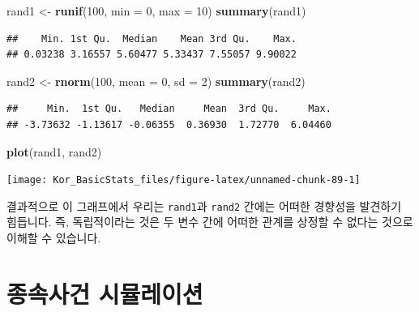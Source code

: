 \documentclass[]{book}
\newenvironment{Shaded}{\begin{snugshade}}{\end{snugshade}}
\newcommand{\DataTypeTok}[1]{\textcolor[rgb]{0.13,0.29,0.53}{#1}}
\newcommand{\DecValTok}[1]{\textcolor[rgb]{0.00,0.00,0.81}{#1}}
\newcommand{\KeywordTok}[1]{\textcolor[rgb]{0.13,0.29,0.53}{\textbf{#1}}}
\newcommand{\NormalTok}[1]{#1}
\newcommand{\StringTok}[1]{\textcolor[rgb]{0.31,0.60,0.02}{#1}}
\begin{document}
\begin{Shaded}
\begin{Highlighting}[]
\NormalTok{rand1 <-}\StringTok{ }\KeywordTok{runif}\NormalTok{(}\DecValTok{100}\NormalTok{, }\DataTypeTok{min =} \DecValTok{0}\NormalTok{, }\DataTypeTok{max =} \DecValTok{10}\NormalTok{)}
\KeywordTok{summary}\NormalTok{(rand1)}
\end{Highlighting}
\end{Shaded}

\begin{verbatim}
##    Min. 1st Qu.  Median    Mean 3rd Qu.    Max. 
## 0.03238 3.16557 5.60477 5.33437 7.55057 9.90022
\end{verbatim}

\begin{Shaded}
\begin{Highlighting}[]
\NormalTok{rand2 <-}\StringTok{ }\KeywordTok{rnorm}\NormalTok{(}\DecValTok{100}\NormalTok{, }\DataTypeTok{mean =} \DecValTok{0}\NormalTok{, }\DataTypeTok{sd =} \DecValTok{2}\NormalTok{)}
\KeywordTok{summary}\NormalTok{(rand2)}
\end{Highlighting}
\end{Shaded}

\begin{verbatim}
##     Min.  1st Qu.   Median     Mean  3rd Qu.     Max. 
## -3.73632 -1.13617 -0.06355  0.36930  1.72770  6.04460
\end{verbatim}

\begin{Shaded}
\begin{Highlighting}[]
\KeywordTok{plot}\NormalTok{(rand1, rand2)}
\end{Highlighting}
\end{Shaded}

\begin{center}\texttt{[image: Kor\_BasicStats\_files/figure-latex/unnamed-chunk-89-1]} \end{center}

결과적으로 이 그래프에서 우리는 \texttt{rand1}과 \texttt{rand2} 간에는 어떠한 경향성을 발견하기 힘듭니다. 즉, 독립적이라는 것은 두 변수 간에 어떠한 관계를 상정할 수 없다는 것으로 이해할 수 있습니다.

\hypertarget{uxc885uxc18duxc0acuxac74-uxc2dcuxbbacuxb808uxc774uxc158}{%
\section{종속사건 시뮬레이션}\label{uxc885uxc18duxc0acuxac74-uxc2dcuxbbacuxb808uxc774uxc158}}
\end{document}
